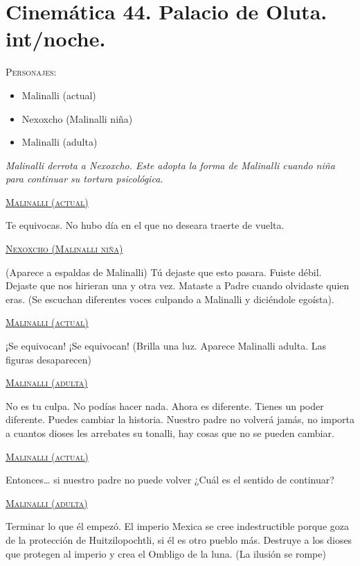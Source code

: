 \section{Cinemática 44. Palacio de Oluta. int/noche. }
\label{Cin:Cinematica44}
 \textsc{Personajes}:
 \begin{itemize}
 \item Malinalli (actual)
\item Nexoxcho (Malinalli niña)
\item Malinalli (adulta)
 \end{itemize}
\textit{Malinalli derrota a Nexoxcho. Este adopta la forma de Malinalli cuando niña para continuar su tortura psicológica.}
\begin{center}
\textsc{\underline{Malinalli (actual)}} 
\\
\par 
Te equivocas. No hubo día en el que no deseara traerte de vuelta. 
\\
\par 
\textsc{\underline{Nexoxcho (Malinalli niña)}}  
\\
\par 
(Aparece a espaldas de Malinalli) Tú dejaste que esto pasara. Fuiste débil. Dejaste que nos hirieran una y otra vez. Mataste a Padre cuando olvidaste quien eras.
(Se escuchan diferentes voces culpando a Malinalli y diciéndole egoísta).
\\
\par 
\textsc{\underline{Malinalli (actual)}} 
\\
\par 
¡Se equivocan! ¡Se equivocan!
(Brilla una luz. Aparece Malinalli adulta. Las figuras desaparecen)
\\
\par 
\textsc{\underline{Malinalli (adulta)}} 
\\
\par 
No es tu culpa. No podías hacer nada. Ahora es diferente. Tienes un poder diferente. Puedes cambiar la historia. Nuestro padre no volverá jamás, no importa a cuantos dioses les arrebates su tonalli, hay cosas que no se pueden cambiar.
\\
\par 
\textsc{\underline{Malinalli (actual)}} 
\\
\par 
Entonces… si nuestro padre no puede volver ¿Cuál es el sentido de continuar?
\\
\par 
\textsc{\underline{Malinalli (adulta)}} 
\\
\par 
Terminar lo que él empezó. El imperio Mexica se cree indestructible porque goza de la protección de Huitzilopochtli, si él es otro pueblo más. Destruye a los dioses que protegen al imperio y crea el Ombligo de la luna.
(La ilusión se rompe) 
\end{center}